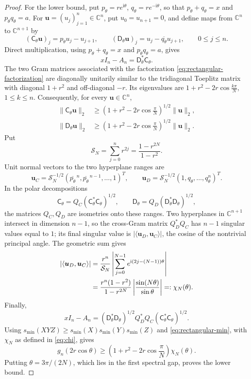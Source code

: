 \documentclass[10pt,twoside]{siamart1116}
\numberwithin{equation}{section}
\newcommand{\C}{\mathbb C}
\newcommand{\ii}{\mathrm i}
\begin{document}
\begin{proof}
For the lower bound, put
\(p_\theta=re^{\ii\theta}\), \(q_\theta=re^{-\ii\theta}\), so that
\(p_\theta+q_\theta=x\) and \(p_\theta q_\theta=a\).  For
\(\boldsymbol u=(u_j)_{j=1}^n\in\C^n\), put \(u_0=u_{n+1}=0\), and
define maps from \(\C^n\) to \(\C^{n+1}\) by
\[
 (\mathsf{C}_\theta\boldsymbol u)_j=p_\theta u_j-u_{j+1},\qquad
 (\mathsf{D}_\theta\boldsymbol u)_j=u_j-\overline{q_\theta}u_{j+1},
 \qquad0\leq j\leq n.
\]
Direct multiplication, using \(p_\theta+q_\theta=x\) and
\(p_\theta q_\theta=a\), gives
\begin{equation}\label{eq:rectangular-factorization}
 xI_n-A_n=\mathsf{D}_\theta^*\mathsf{C}_\theta.
\end{equation}
The two Gram matrices associated with the factorization
\eqref{eq:rectangular-factorization} are
diagonally unitarily similar to the tridiagonal Toeplitz matrix with
diagonal \(1+r^2\) and off-diagonal \(-r\).  Its eigenvalues are
\(1+r^2-2r\cos\frac{k\pi}{N}\), \(1\leq k\leq n\).  Consequently, for
every \(\boldsymbol u\in\C^n\),
\begin{equation}\label{eq:rectangular-min}
 \begin{aligned}
  \lVert\mathsf C_\theta\boldsymbol u\rVert_2
  &\geq \left(1+r^2-2r\cos\frac{\pi}{N}\right)^{1/2}
    \lVert\boldsymbol u\rVert_2,\\
  \lVert\mathsf D_\theta\boldsymbol u\rVert_2
  &\geq \left(1+r^2-2r\cos\frac{\pi}{N}\right)^{1/2}
    \lVert\boldsymbol u\rVert_2.
 \end{aligned}
\end{equation}
Put
\[
 \mathcal S_N=\sum_{j=0}^nr^{2j}=\frac{1-r^{2N}}{1-r^2}.
\]
Unit normal vectors to the two hyperplane ranges are
\[
 \boldsymbol u_C=\mathcal S_N^{-1/2}
 (\overline{p_\theta}^{\,n},\overline{p_\theta}^{\,n-1},\ldots,1)^T,
 \qquad
 \boldsymbol u_D=\mathcal S_N^{-1/2}(1,q_\theta,\ldots,q_\theta^n)^T.
\]
In the polar decompositions
\[
 \mathsf{C}_\theta=Q_C(\mathsf{C}_\theta^*\mathsf{C}_\theta)^{1/2},
 \qquad
 \mathsf{D}_\theta=Q_D(\mathsf{D}_\theta^*\mathsf{D}_\theta)^{1/2},
\]
the matrices \(Q_C,Q_D\) are isometries onto these ranges.  Two
hyperplanes in \(\C^{n+1}\) intersect in dimension \(n-1\), so
the cross-Gram matrix \(Q_D^*Q_C\) has \(n-1\) singular values equal to
\(1\); its final singular value is
\(|\langle\boldsymbol u_D,\boldsymbol u_C\rangle|\), the cosine of the
nontrivial principal angle.  The
geometric sum gives
\begin{align}
 |\langle\boldsymbol u_D,\boldsymbol u_C\rangle|
 &=\frac{r^n}{\mathcal S_N}
 \left|\sum_{j=0}^{N-1}e^{\ii(2j-(N-1))\theta}\right|\notag\\
 &=
 \frac{r^n(1-r^2)}{1-r^{2N}}
 \left|\frac{\sin(N\theta)}{\sin\theta}\right|
 =:\chi_N(\theta).
\label{eq:chi}
\end{align}
Finally,
\[
 xI_n-A_n=(\mathsf{D}_\theta^*\mathsf{D}_\theta)^{1/2}
 Q_D^*Q_C(\mathsf{C}_\theta^*\mathsf{C}_\theta)^{1/2}.
\]
Using \(s_{\min}(XYZ)\geq
s_{\min}(X)s_{\min}(Y)s_{\min}(Z)\) and
\eqref{eq:rectangular-min}, with \(\chi_N\) as defined in
\eqref{eq:chi}, gives
\[
 g_n(2r\cos\theta)\geq
 \left(1+r^2-2r\cos\frac{\pi}{N}\right)\chi_N(\theta).
\]
Putting \(\theta=3\pi/(2N)\), which lies in the first spectral gap,
proves the lower bound.


\end{proof}
\end{document}
